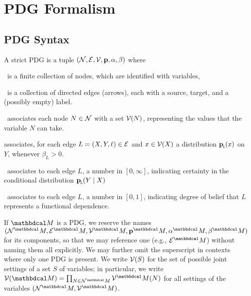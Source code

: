 \documentclass[the-pdg-manual.tex]{subfiles}
\begin{document}
	\section{PDG Formalism}
	\subsection{PDG Syntax}
	\def\pdgvars[#1]{(\N#1, \Ed#1, \V#1, \mat p#1, \alpha#1,\beta#1)}
	\begin{defn}[sPDG]\label{def:sPDG}
		A strict PDG is a tuple $\pdgvars[]$ where
		\begin{description}[nosep]
			\item[$\N$]~is a finite collection of nodes, which are identified with variables,
			\item[$\Ed$]~is a collection of directed edges (arrows), each with a source, target, and a (possibly empty) label.
			\item[$\V$]~associates each node $N \in \mathcal N$ with a set $\mathcal V(N)$,
			representing the values that the variable $N$ can take. 
			\item[$\mathbf p$] associates, for each edge $L = (X,Y, \ell) \in \mathcal E$ and $x \in \mathcal V(X)$ a distribution $\mathbf{p}_{\!_{L}\!}(x)$ on $Y$, whenever $\beta_L > 0$.
			\item[$\beta$]~associates to each edge $L$, a number in $[0,\infty]$, indicating certainty in the conditional distribution $\mathbf{p}_{\!_{L}\!}(Y \mid X)$ 
			\item[$\alpha$]~associates to each edge $L$, a number in $[0,1]$, indicating degree of belief that $L$ represents a functional dependence.
		\end{description}
		\vspace{-1.4em}
	\end{defn}

	If $\dg M$ is a PDG, we reserve the names $\pdgvars[^\dg M]$
	for its components, so that we may reference one (e.g.,
	$\Ed^\dg M$) without naming them all explicitly. We may further omit the superscript in contexts where only one PDG is present. 
	We write $\mathcal V(S)$ for the set of possible joint settings of a set $S$
	of variables; in particular, 
	we write $\V(\dg M)
	= \prod_{N \in \N^\dg M} \V^\dg M(N)$
	for all settings of the variables $(\N^\dg M, \V^\dg M)$.
	
\end{document}
